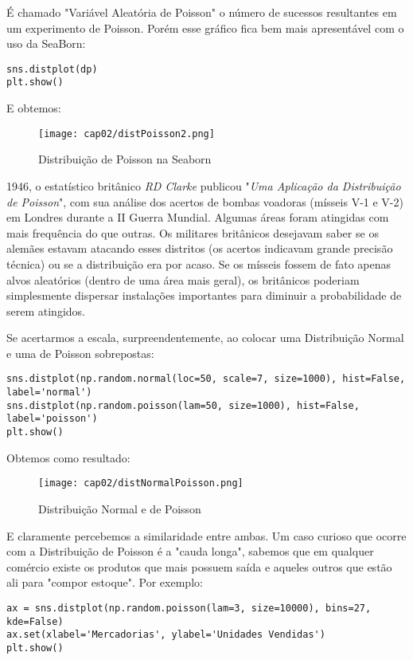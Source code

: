 É chamado "Variável Aleatória de Poisson" o número de sucessos resultantes em um experimento de Poisson. Porém esse gráfico fica bem mais apresentável com o uso da SeaBorn:
\begin{lstlisting}[]
sns.distplot(dp)
plt.show()
\end{lstlisting}

E obtemos:
\begin{figure}[H]
	\centering
	\texttt{[image: cap02/distPoisson2.png]}
	\caption{Distribuição de Poisson na Seaborn}
\end{figure}

\begin{note} 
	1946, o estatístico britânico \textit{RD Clarke} publicou "\textit{Uma Aplicação da Distribuição de Poisson}", com sua análise dos acertos de bombas voadoras (mísseis V-1 e V-2) em Londres durante a II Guerra Mundial. Algumas áreas foram atingidas com mais frequência do que outras. Os militares britânicos desejavam saber se os alemães estavam atacando esses distritos (os acertos indicavam grande precisão técnica) ou se a distribuição era por acaso. Se os mísseis fossem de fato apenas alvos aleatórios (dentro de uma área mais geral), os britânicos poderiam simplesmente dispersar instalações importantes para diminuir a probabilidade de serem atingidos.
\end{note}

Se acertarmos a escala, surpreendentemente, ao colocar uma Distribuição Normal e uma de Poisson sobrepostas:
\begin{lstlisting}[]
sns.distplot(np.random.normal(loc=50, scale=7, size=1000), hist=False, label='normal')
sns.distplot(np.random.poisson(lam=50, size=1000), hist=False, label='poisson')
plt.show() 
\end{lstlisting}

Obtemos como resultado:
\begin{figure}[H]
	\centering
	\texttt{[image: cap02/distNormalPoisson.png]}
	\caption{Distribuição Normal e de Poisson}
\end{figure}

E claramente percebemos a similaridade entre ambas. Um caso curioso que ocorre com a Distribuição de Poisson é a "cauda longa", sabemos que em qualquer comércio existe os produtos que mais possuem saída e aqueles outros que estão ali para "compor estoque". Por exemplo:
\begin{lstlisting}[]
ax = sns.distplot(np.random.poisson(lam=3, size=10000), bins=27, kde=False)
ax.set(xlabel='Mercadorias', ylabel='Unidades Vendidas')
plt.show()
\end{lstlisting}

